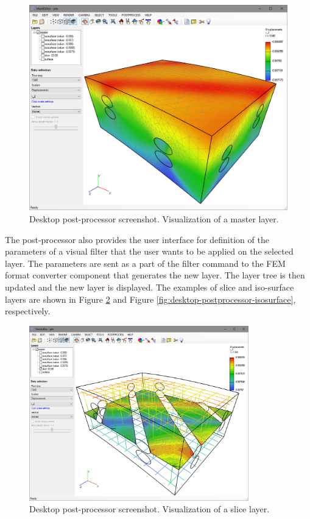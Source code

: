 \begin{figure}[H]
    \centering
    \includegraphics[width=\textwidth]{figures/chapter-data-management/desktop-postprocessor-master}
    \decoRule
    \caption{Desktop post-processor screenshot. Visualization of a master layer.}
    \label{fig:desktop-postprocessor-master}
\end{figure}

The post-processor also provides the user interface for definition of the parameters of a visual filter that the user wants to be applied on the selected layer. The parameters are sent as a part of the filter command to the FEM format converter component that generates the new layer. The layer tree is then updated and the new layer is displayed. The examples of slice and iso-surface layers are shown in Figure \ref{fig:desktop-postprocessor-slice} and Figure \ref{fig:desktop-postprocessor-isosurface}, respectively.

\begin{figure}[H]
    \centering
    \includegraphics[width=0.85\textwidth]{figures/chapter-data-management/desktop-postprocessor-slice}
    \decoRule
    \caption{Desktop post-processor screenshot. Visualization of a slice layer.}
    \label{fig:desktop-postprocessor-slice}
\end{figure}

